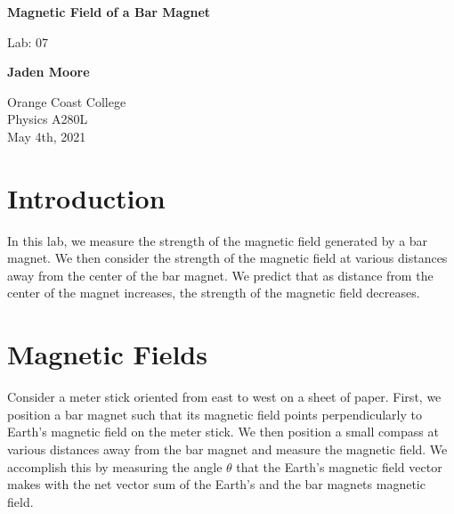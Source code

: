 \documentclass[12pt]{article}
\begin{document}

\begin{filecontents}{data1.csv}
    X	 Y
    20	2.572
    25	1.123
    30	0.64
    34	0.42
    40	0.277
    50	0.125
    60	0.053
    70	0.017
    };
\end{filecontents}

\begin{filecontents}{data2.csv}
     X	 Y
    20	0.714
    25	0.555
    30	0.363
    34	0.255
    40	0.212
    50	0.125
    60	0.097
    70	0.053
    };
\end{filecontents}

\begin{titlepage}
    \begin{center}
        \vspace*{1cm}
        \textbf{Magnetic Field of a Bar Magnet}

        \vspace{0.5cm}
        Lab: 07

        \vspace{1cm}

        \textbf{Jaden Moore}

        \vfill

        Orange Coast College\\
        Physics A280L\\
        May 4th, 2021

    \end{center}
\end{titlepage}

\pagestyle{fancy}
\fancyhf{}
\setlength{\headheight}{15pt}
\cfoot{\thepage}

\section{Introduction}
In this lab, we measure the strength of the magnetic field generated by a bar magnet. We then consider the strength of the magnetic field at various distances away from the center of the bar magnet. We predict that as distance from the center of the magnet increases, the strength of the magnetic field decreases.

\section{Magnetic Fields}
Consider a meter stick oriented from east to west on a sheet of paper. First, we position a bar magnet such that its magnetic field points perpendicularly to Earth's magnetic field on the meter stick. We then position a small compass at various distances away from the bar magnet and measure the magnetic field. We accomplish this by measuring the angle $\theta$ that the Earth's magnetic field vector makes with the net vector sum of the Earth's and the bar magnets magnetic field.
\end{document}
